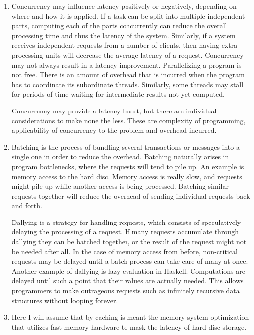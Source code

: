 \documentclass[11pt]{article}
\begin{document}
\begin{enumerate}
  \item
    Concurrency may influence latency positively or negatively, depending on where
    and how it is applied. If a task can be split into multiple independent parts,
    computing each of the parts concurrently can reduce the overall processing time and
    thus the latency of the system. Similarly, if a system receives independent
    requests from a number of clients, then having extra processing units will
    decrease the average latency of a request.  Concurrency may not always result in
    a latency improvement. Parallelizing a program is not free. There is an amount
    of overhead that is incurred when the program has to coordinate its subordinate
    threads. Similarly, some threads may stall for periods of time waiting for
    intermediate results not yet computed.

    Concurrency may provide a latency boost, but there are individual considerations
    to make none the less. These are complexity of programming, applicability of
    concurrency to the problem and overhead incurred.

  \item
    Batching is the process of bundling several transactions or messages into a
    single one in order to reduce the overhead. Batching naturally arises in
    program bottlenecks, where the requests will tend to pile up. An example is
    memory access to the hard disc. Memory access is really slow, and requests
    might pile up while another access is being processed. Batching similar
    requests together will reduce the overhead of sending individual requests
    back and forth.

    Dallying is a strategy for handling requests, which consists of speculatively
    delaying the processing of a request. If many requests accumulate through
    dallying they can be batched together, or the result of the request might not be
    needed after all. In the case of memory access from before, non-critical
    requests may be delayed until a batch process can take care of many at once.
    Another example of dallying is lazy evaluation in Haskell. Computations are
    delayed until such a point that their values are actually needed. This
    allows programmers to make outrageous requests such as infinitely recursive
    data structures without looping forever.

  \item
    Here I will assume that by caching is meant the memory system optimization
    that utilizes fast memory hardware to mask the latency of hard disc storage.


\end{enumerate}
\end{document}
